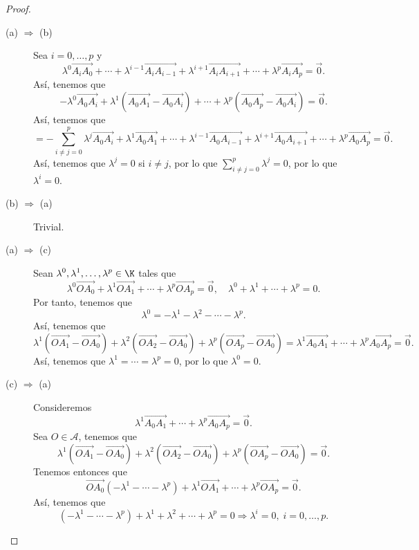 \begin{proof}
\begin{description}
\item[(a) $\displaystyle \Rightarrow $ (b)] Sea $\displaystyle i = 0, \ldots, p $ y
	\[ \lambda^{0}\overrightarrow{A_{i}A_{0}} +  \cdots  + \lambda^{i-1} \overrightarrow{A_{i}A_{i - 1}} + \lambda^{i+1} \overrightarrow{A_{i}A_{i+1}} +  \cdots  + \lambda^{p} \overrightarrow{A_{i}A_{p}} = \vec{0} .\]
	Así, tenemos que
	\[ - \lambda^{0}\overrightarrow{A_{0}A_{i}} + \lambda^{1}\left(\overrightarrow{A_{0}A_{1}}-\overrightarrow{A_{0}A_{i}}\right) + \cdots + \lambda^{p}\left(\overrightarrow{A_{0}A_{p}} - \overrightarrow{A_{0}A_{i}}\right) = \vec{0} .\]
Así, tenemos que
\[ = - \sum^{p}_{i \neq j = 0}\lambda^{j}\overrightarrow{A_{0}A_{i}} + \lambda^{1}\overrightarrow{A_{0}A_{1}} + \cdots + \lambda^{i-1}\overrightarrow{A_{0}A_{i-1}} + \lambda^{i+1}\overrightarrow{A_{0}A_{i+1}}+ \cdots + \lambda^{p}\overrightarrow{A_{0}A_{p}} = \vec{0}.\]
Así, tenemos que $\displaystyle \lambda^{j} = 0 $ si $\displaystyle i \neq j $, por lo que $\displaystyle \sum^{p}_{i \neq j=0}\lambda^{j}= 0 $, por lo que $\displaystyle \lambda^{i} = 0 $. 
\item[(b) $\displaystyle \Rightarrow $ (a)] Trivial.
\item[(a) $\displaystyle \Rightarrow $ (c)] Sean $\displaystyle \lambda^{0}, \lambda^{1}, \ldots, \lambda^{p} \in \K $ tales que  
\[ \lambda^{0}\overrightarrow{OA_{0}} + \lambda^{1}\overrightarrow{OA_{1}} + \cdots + \lambda^{p}\overrightarrow{OA_{p}} = \vec{0},\quad \lambda^{0} + \lambda^{1} + \cdots + \lambda^{p} = 0.\]
	Por tanto, tenemos que 
\[\lambda^{0} = - \lambda^{1}-\lambda^{2}-\cdots - \lambda^{p} .\]
Así, tenemos que 
\[\lambda^{1}\left(\overrightarrow{OA_{1}}-\overrightarrow{OA_{0}}\right) + \lambda^{2}\left(\overrightarrow{OA_{2}}-\overrightarrow{OA_{0}}\right) + \lambda^{p}\left(\overrightarrow{OA_{p}}-\overrightarrow{OA_{0}}\right) = \lambda^{1}\overrightarrow{A_{0}A_{1}} + \cdots + \lambda^{p}\overrightarrow{A_{0}A_{p}} = \vec{0} .\]
Así, tenemos que $\displaystyle \lambda^{1} = \cdots = \lambda^{p} = 0 $, por lo que $\displaystyle \lambda^{0} = 0 $.
\item[(c) $\displaystyle \Rightarrow $ (a)] Consideremos 
	\[ \lambda^{1}\overrightarrow{A_{0}A_{1}} + \cdots + \lambda^{p}\overrightarrow{A_{0}A_{p}} = \vec{0}.\]
	Sea $\displaystyle O \in \mathcal{A} $, tenemos que 
	\[ \lambda^{1}\left(\overrightarrow{OA_{1}}-\overrightarrow{OA_{0}}\right) + \lambda^{2}\left(\overrightarrow{OA_{2}}-\overrightarrow{OA_{0}}\right) + \lambda^{p}\left(\overrightarrow{OA_{p}}-\overrightarrow{OA_{0}}\right) = \vec{0}.\]
Tenemos entonces que
\[ \overrightarrow{OA_{0}} \left(-\lambda^{1}-\cdots -\lambda^{p}\right) + \lambda^{1}\overrightarrow{OA_{1}} + \cdots + \lambda^{p}\overrightarrow{OA_{p}} = \vec{0}.\]
Así, tenemos que 
\[ \left(-\lambda^{1} - \cdots - \lambda^{p}\right) + \lambda^{1}+\lambda^{2} +\cdots + \lambda^{p}=0 \Rightarrow \lambda^{i} = 0, \; i = 0, \ldots, p .\]
\end{description}
\end{proof}
